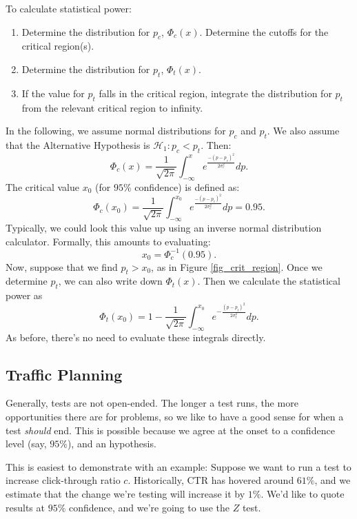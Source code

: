 \documentclass{article}
\numberwithin{equation}{section}
\begin{document}
To calculate statistical power:
\begin{enumerate}
	\item Determine the distribution for $p_c$, $\Phi_c(x)$. Determine the cutoffs for the critical region(s).
	\item Determine the distribution for $p_t$, $\Phi_t(x)$.
	\item If the value for $p_t$ falls in the critical region, integrate the distribution for $p_t$ from the relevant critical region to infinity.
\end{enumerate}
In the following, we assume normal distributions for $p_c$ and $p_t$. We also assume that the Alternative Hypothesis is $\mathcal{H}_1 : p_c < p_t$. Then:
\begin{equation}
	\Phi_c(x) = \frac{1}{\sqrt{2\pi}}\int_{-\infty}^x e^{\frac{-(p-p_c)^2}{2\sigma_c^2}} dp.
\end{equation}
The critical value $x_0$ (for $95\%$ confidence) is defined as:
\begin{equation}
	\Phi_c(x_0) = \frac{1}{\sqrt{2\pi}}\int_{-\infty}^{x_0} e^{\frac{-(p-p_c)^2}{2\sigma_c^2}} dp = 0.95.
\end{equation}
Typically, we could look this value up using an inverse normal distribution calculator. Formally, this amounts to evaluating:
\begin{equation}
	x_0 = \Phi_c^{-1}(0.95).
\end{equation}
Now, suppose that we find $p_t > x_0$, as in Figure \ref{fig_crit_region}. Once we determine $p_t$, we can also write down $\Phi_t(x)$. Then we calculate the statistical power as
\begin{equation}
	\Phi_t(x_0) = 1 - \frac{1}{\sqrt{2\pi}} \int_{-\infty}^{x_0} e^{-\frac{(p-p_t)^2}{2\sigma_t^2}} dp.
\end{equation}
As before, there's no need to evaluate these integrals directly. 

\subsection{Traffic Planning}

Generally, tests are not open-ended. The longer a test runs, the more opportunities there are for problems, so we like to have a good sense for when a test \textit{should} end. This is possible because we agree at the onset to a confidence level (say, $95\%$), and an hypothesis.

This is easiest to demonstrate with an example: Suppose we want to run a test to increase click-through ratio $c$. Historically, CTR has hovered around $61\%$, and we estimate that the change we're testing will increase it by $1\%$. We'd like to quote results at $95\%$ confidence, and we're going to use the $Z$ test. 
\end{document}
